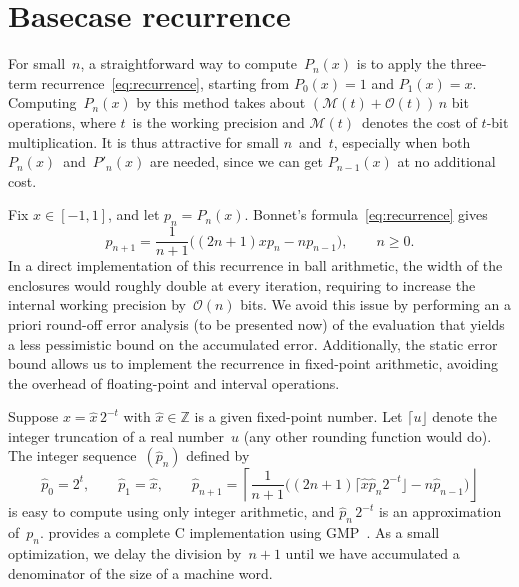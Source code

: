 \documentclass[nohypdvips,review]{siamart0216}
\newcommand{\OO}{\mathcal{O}}
\newcommand{\MM}{\mathcal{M}}
\begin{document}
\section{Basecase recurrence}

\label{sec:recurrence}

For small $n$, a straightforward way to compute~$P_n(x)$ is to apply
the three-term recurrence \cref{eq:recurrence},
starting from $P_0(x)=1$ and ${P_1(x) = x}$.
Computing~$P_n(x)$ by this method takes about $(\MM(t) + \OO(t))\, n$
bit operations, where $t$ is the working precision and $\MM(t)$ denotes the
cost of $t$-bit multiplication.
It is thus attractive for small $n$ and $t$, especially when both
$P_n(x)$ and $P'_n(x)$ are needed, since we can get $P_{n-1}(x)$ at no
additional cost.

Fix $x \in [-1, 1]$, and let $p_n = P_n(x)$.
Bonnet's formula~\cref{eq:recurrence} gives
\begin{equation} \label{eq:rec-bis}
  p_{n + 1} =
    \frac{1}{n+1}
    \bigl( (2n +1) x p_n - n p_{n-1} \bigr),
  \qquad n \geq 0.
\end{equation}
In a direct implementation of this recurrence in ball arithmetic, the
width of the enclosures would roughly double at every iteration,
requiring to increase the internal working precision by $\OO(n)$ bits.
We avoid this issue by performing an a priori round-off error
analysis (to be presented now) of the evaluation that yields a less
pessimistic bound on the accumulated error.
Additionally, the static error bound allows us to implement the
recurrence in fixed-point arithmetic, avoiding the overhead of
floating-point and interval operations.

Suppose $x = \hat x \, 2^{-t}$ with $\hat x \in \mathbb Z$
is a given fixed-point number.
Let $\lceil u \rfloor$ denote the integer truncation of a real
number~$u$ (any other rounding function would do).
The integer sequence $(\hat p_n)$ defined by
\begin{equation} \label{eq:rec-fxpt}
  \hat{p}_0 = 2^t, \qquad
  \hat{p}_1 = \hat x, \qquad
  \hat{p}_{n + 1} =
    \left\lceil \frac{1}{n + 1}  \bigl( (2 n + 1) \lceil \hat{x}
      \hat{p}_n 2^{- t} \rfloor - n \hat{p}_{n - 1} \bigr)
    \right\rfloor
\end{equation}
is easy to compute using only integer arithmetic, and
$\hat p_n \, 2^{-t}$ is an approximation of~$p_n$.
 provides a complete C implementation
using GMP~\cite{granlund2017}.
As a small optimization, we delay the division by~$n+1$ until we have
accumulated a denominator of the size of a machine word.
\end{document}
